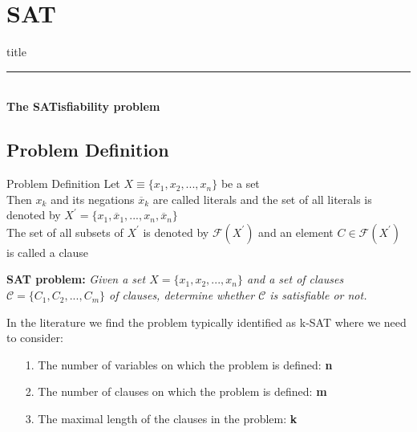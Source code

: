 \section{SAT}

	\begin{frame}[plain]
		\vfill
		\centering
		\begin{beamercolorbox}[sep=8pt,center,shadow=true,rounded=true]{title}
			\textbf{\insertsectionhead}\par%
			\color{polimiblue}\noindent\rule{10cm}{1pt} \\
			\textbf{The SATisfiability problem}
		\end{beamercolorbox}
		\vfill
	\end{frame}

	\subsection{Problem Definition}
		\begin{frame}{Problem Definition}
			\small
			 Let $X\equiv\{x_1, x_2, ..., x_n\}$ be a set\\
			 \vspace{0.1cm}
			 Then $x_k$ and its negations $\overline{x}_k$ are called literals and the set of all literals is denoted by $X^{'}=\{x_1, \overline{x}_1, ..., x_n, \overline{x}_n\}$\\
			 \vspace{0.1cm}
			 The set of all subsets of $X^{'}$ is denoted by $\mathcal{F}(X^{'})$ and an element $C\in\mathcal{F}(X^{'})$ is called a clause\\
			 
			 \vspace{0.3cm}
			 
			 \textbf{SAT problem:} \emph{Given a set $X=\{x_1, x_2, ..., x_n\}$ and a set of clauses $\mathcal{C}=\{C_1, C_2, ..., C_m\}$ of clauses, determine whether $\mathcal{C}$ is satisfiable or not.\\}
			 
			 \vspace{0.3cm}
			 
			 In the literature we find the problem typically identified as k-SAT where we need to consider:
			 \begin{itemize}
			 	\item[1.] The number of variables on which the problem is defined: \textbf{n}
			 	
			 	\item[2.] The number of clauses on which the problem is defined: \textbf{m}
			 	
			 	\item[3.] The maximal length of the clauses in the problem: \textbf{k}
			 \end{itemize}
		\end{frame}
	
